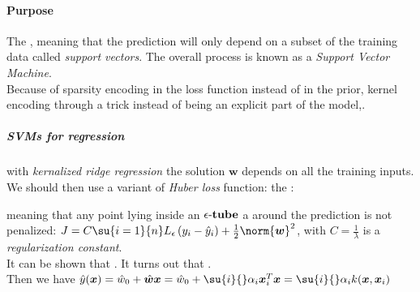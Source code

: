 \paragraph{Purpose}
The , meaning that the prediction will only depend on a
subset of the training data called \emph{support vectors}. The overall 
process is known as a \emph{Support Vector Machine}.\\
Because of sparsity encoding in the loss function instead of in the prior, 
kernel encoding through a trick instead of being an explicit part of the 
model,.
\subparagraph{SVMs for regression}
with \emph{kernalized ridge regression} the solution $\bm{w}$ depends on all 
the training inputs. We should then use a variant of \emph{Huber loss} 
function: the : 
\begin{center}
\end{center}
meaning that any point lying inside an $\epsilon\text{-\textbf{tube}}$ a
around the prediction is not penalized: $J=C\su{i=1}{n}L_{\epsilon}\left(
y_{i} - \hat{y}_{i}\right) + \frac{1}{2}\norm{\bm{w}}^{2}$, with $C=\frac{1}{
\lambda}$ is a \emph{regularization constant}.\\
It can be shown that . It turns out that .\\
Then we have $\hat{y}(\bm{x}) = \hat{w}_{0} + \hat{\bm{w}}\bm{x}  = \hat{w}_{0}
+ \su{i}{}\alpha_{i}\bm{x}_{i}^{T}\bm{x} = \su{i}{}\alpha_{i}k(\bm{x},\bm{x}_{i})$

